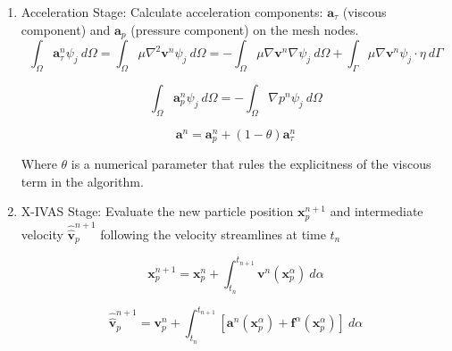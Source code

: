\begin{enumerate}
  \item Acceleration Stage: Calculate acceleration components: $\mathbf{a}_{\tau}$ (viscous component) and $\mathbf{a}_{p}$ (pressure component) on the mesh nodes.
  \begin{equation}\label{Step1a}
\int_{\Omega}\mathbf{a}^{n}_{\tau}\psi_j\ d\Omega=\int_{\Omega}\mu \nabla^{2}\mathbf{v}^{n} \psi_j\ d\Omega=-\int_{\Omega}\mu \nabla\mathbf{v}^{n} \nabla \psi_j\ d\Omega + \int_{\Gamma}\mu \nabla\mathbf{v}^{n} \psi_j \cdot \eta \ d\Gamma
\end{equation}

\begin{equation}\label{Step1b}
\int_{\Omega}\mathbf{a}^{n}_{p}\psi_j\ d\Omega=-\int_{\Omega}\nabla p^{n} \psi_j\ d\Omega
\end{equation}

\begin{equation}\label{Step1c}
\mathbf{a}^{n}=\mathbf{a}^{n}_{p} + (1-\theta)\mathbf{a}^{n}_{\tau}
\end{equation}

Where $\theta$ is a numerical parameter that rules the explicitness of the viscous term in the algorithm.

  \item X-IVAS Stage: Evaluate the new particle position $\mathbf{x}^{n+1}_{p}$ and intermediate velocity $\widehat{\widehat{\mathbf{v}}}^{n+1}_{p}$ following the velocity streamlines at time $t_n$

  \begin{equation}\label{Step2a}
\mathbf{x}^{n+1}_{p}=\mathbf{x}^{n}_{p} + \int_{t_n}^{t_{n+1}} \mathbf{v}^{n}(\mathbf{x}_p^{\alpha}) \ d\alpha
\end{equation}

\begin{equation}\label{Step2b}
\displaystyle \widehat{\widehat{\mathbf{v}}}^{n+1}_{p}=\mathbf{v}^{n}_{p} +
\int_{t_n}^{t_{n+1}} \left[ \mathbf{a}^{n}(\mathbf{x}_p^{\alpha}) + \mathbf{f}^{\alpha} (\mathbf{x}_p^{\alpha}) \right]
 \ d\alpha
\end{equation}


\end{enumerate}
